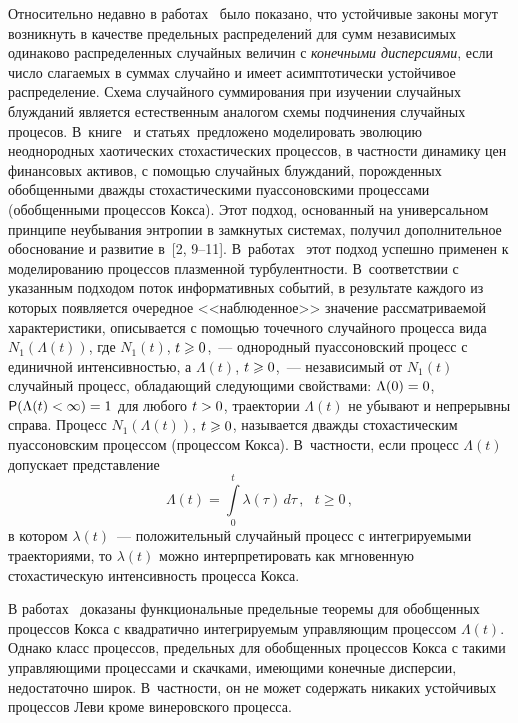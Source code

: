 \begin{multicols}{2}
Относительно недавно в работах~\cite{Korolev1998, Korolev1999} было
показано, что устойчивые законы могут возникнуть в качестве
предельных распределений для сумм независимых одинаково
распределенных случайных величин с {\it конечными дисперсиями}, если
число слагаемых в суммах случайно и имеет асимптотически устойчивое
распределение. Схема случайного суммирования при изучении случайных
блужданий является естественным аналогом схемы подчинения случайных
процесов. В~книге~\cite{GnedenkoKorolev1996} и
статьях~\cite{Korolev1997, Korolev2000}\linebreak предложено моделировать эволюцию
неоднородных хаотических стохастических процессов, в част\-ности
динамику цен финансовых активов, с по\-мощью случайных блужданий,
порожденных обобщен\-ны\-ми дважды стохастическими пуассоновскими
процессами (обобщенными процессов Кокса). Этот подход, основанный на
универсальном принципе неубывания энтропии в замкнутых системах,
получил дополнительное обоснование и развитие в~[2, 9--11].
В~работах~\cite{Korolev2011, KorolevSkvortsova2006} этот подход
успешно применен к моделированию процессов плазменной
турбулентности. В~соответствии с указанным подходом поток
информативных событий, в результате каждого из которых появляется
очередное <<наблюденное>> значение рассматриваемой характеристики,
описывается с помощью точечного случайного процесса вида
$N_1(\Lambda(t))$, где $N_1(t)$, $t\hm\geqslant0$,~--- однородный
пуассоновский процесс с единичной интенсивностью, а $\Lambda(t)$,
$t\hm\geqslant0$,~--- независимый от $N_1(t)$ случайный процесс, обладающий
следующими свойствами: $\Lambda(0)\hm=0$, ${\sf
P}(\Lambda(t)\hm<\infty)\hm=1$ для любого $t\hm>0$, траектории $\Lambda(t)$
не убывают и непрерывны справа. Процесс $N_1(\Lambda(t))$, $t\hm\geqslant0$,
называется дважды стохастическим пуассоновским процессом (процессом
Кокса). В~част\-ности, если процесс $\Lambda(t)$ допускает
представление
$$
\Lambda(t)=\int\limits_{0}^{t}\lambda(\tau)\,d\tau\,,\ \ \ t\geqslant0\,,
$$
в котором $\lambda(t)$~--- положительный случайный процесс с
интегрируемыми траекториями, то $\lambda(t)$ можно интерпретировать
как мгновенную стохастическую интенсивность процесса Кокса.

В работах~\cite{Kashcheev2000, Kashcheev2001} доказаны
функциональные предельные теоремы для обобщенных процессов Кокса с
квадратично интегрируемым управ\-ля\-ющим процессом $\Lambda(t)$. Однако
класс процессов, предель\-ных для обобщенных процессов Кокса с \mbox{такими}
управ\-ля\-ющи\-ми процессами и скачками, имеющи\-ми конечные дисперсии,
недостаточно широк. В~частности, он не может содержать никаких
устойчивых процессов Леви кроме винеровского про\-цесса.


\end{multicols}
